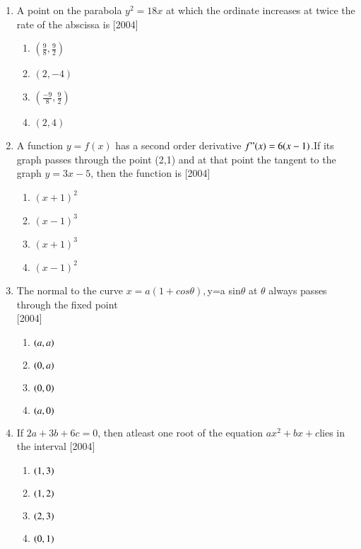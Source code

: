 \documentclass[journal,12pt,twocolumn]{IEEEtran}
\theoremstyle{remark}
\begin{document}
\begin{enumerate}
\begin{enumerate}
								\end{enumerate}
								\item A point on the parabola $y^2=18x$ at which the ordinate increases at twice the rate of the abscissa is \hfill{[2004]}
								\begin{enumerate}
								    \item $(\frac{9}{8},\frac{9}{2})$
								        \item $(2,-4)$
									    \item $(\frac{-9}{8},\frac{9}{2})$
									        \item $(2,4)$
										\end{enumerate}
										\item A function $y=f(x)$ has a second order derivative $f"(x)=6(x-1)$.If its graph passes through the point (2,1) and at that point the tangent to the graph $y=3x-5$, then the function is \hfill{[2004]}
										\begin{enumerate}
										    \item $(x+1)^2$
										        \item $(x-1)^3$
											    \item $(x+1)^3$
											        \item $(x-1)^2$
												\end{enumerate}
												\item The normal to the curve $x=a(1+cos\theta)$$, $y=a sin$\theta$ at $\theta$ always passes through the fixed point\\ \hfill{[2004]}
												\begin{enumerate}
												    \item $\brak{a,a}$
												        \item $\brak{0,a}$
													    \item $\brak{0,0}$
													        \item $\brak{a,0}$
														\end{enumerate}
														\item If $2a+3b+6c=0$, then atleast one root of the equation $ax^2+bx+c$lies in the interval \hfill{[2004]}
														\begin{enumerate}
														    \item $\brak{1,3}$
														        \item $\brak{1,2}$
															    \item $\brak{2,3}$
															        \item $\brak{0,1}$
																\end{enumerate}  
$$
\end{enumerate}
\end{document}

